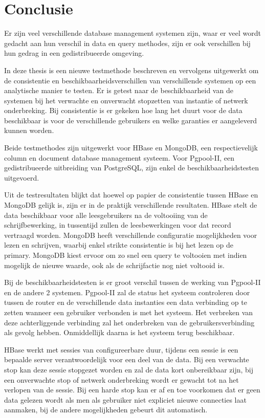 \chapter{Conclusie}\label{sec:conclusie}
Er zijn veel verschillende database management systemen zijn, waar er veel wordt gedacht aan hun verschil in data en query methodes, zijn er ook verschillen bij hun gedrag in een gedistribueerde omgeving.

In deze thesis is een nieuwe testmethode beschreven en vervolgens uitgewerkt om de consistentie en beschikbaarheidsverschillen van verschillende systemen op een analytische manier te testen. Er is getest naar de beschikbaarheid van de systemen bij het verwachte en onverwacht stopzetten van instantie of netwerk onderbreking. Bij consistentie is er gekeken hoe lang het duurt voor de data beschikbaar is voor de verschillende gebruikers en welke garanties er aangeleverd kunnen worden. 

Beide testmethodes zijn uitgewerkt voor HBase en MongoDB, een respectievelijk column en document database management systeem. Voor Pgpool-II, een gedistribueerde uitbreiding van PostgreSQL, zijn enkel de beschikbaarheidstesten uitgevoerd. 

Uit de testresultaten blijkt dat hoewel op papier de consistentie tussen HBase en MongoDB gelijk is, zijn er in de praktijk verschillende resultaten. HBase stelt de data beschikbaar voor alle leesgebruikers na de voltooiing van de schrijfbewerking, in tussentijd zullen de leesbewerkingen voor dat record vertraagd worden. MongoDB heeft verschillende configuratie mogelijkheden voor lezen en schrijven, waarbij enkel strikte consistentie is bij het lezen op de primary. MongoDB kiest ervoor om zo snel een query te voltooien met indien mogelijk de nieuwe waarde, ook als de schrijfactie nog niet voltooid is. 

Bij de beschikbaarheidstesten is er groot verschil tussen de werking van Pgpool-II en de andere 2 systemen. Pgpool-II zal de status het systeem controleren door tussen de router en de verschillende data instanties een data verbinding op te zetten wanneer een gebruiker verbonden is met het systeem. Het verbreken van deze achterliggende verbinding zal het onderbreken van de gebruikersverbinding als gevolg hebben. Onmiddellijk daarna is het systeem terug beschikbaar. 

HBase werkt met sessies van configureerbare duur, tijdens een sessie is een bepaalde server verantwoordelijk voor een deel van de data. Bij een verwachte stop kan deze sessie stopgezet worden en zal de data kort onbereikbaar zijn, bij een onverwachte stop of netwerk onderbreking wordt er gewacht tot na het verlopen van de sessie. Bij een harde stop kan er af en toe voorkomen dat er geen data gelezen wordt als men als gebruiker niet expliciet nieuwe connecties laat aanmaken, bij de andere mogelijkheden gebeurt dit automatisch. 

